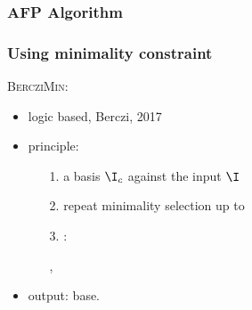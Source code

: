 \begin{frame}
\frametitle{AFP Algorithm}
\end{frame}

\begin{frame}
\frametitle{Using minimality constraint}

\textsc{BercziMin}:
\begin{itemize}
	\item logic based, Berczi, 2017
	\item principle:
		\begin{itemize}
			\item[\color{belize} 1.]  a basis $\I_c$ against the input $\I$
			
			\item[\color{belize} 2.] repeat minimality selection up to 
			
			\item[\color{belize} 3.] :
			
			\item[ ] ,
			
			\item[ ] 
			 
		\end{itemize}
	\item output:  base.
\end{itemize}

\end{frame}




